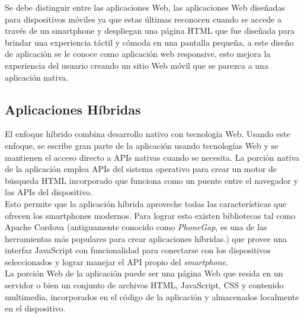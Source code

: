   Se debe distinguir entre las aplicaciones Web, las aplicaciones Web diseñadas para dispositivos móviles ya que estas últimas reconocen cuando se accede a través de un smartphone y despliegan una página HTML que fue diseñada para brindar una experiencia táctil y cómoda en una pantalla pequeña, a este diseño de aplicación se le conoce como aplicación web responsive, esto mejora la experiencia del usuario creando un sitio Web móvil que se parezca a una aplicación nativa.\\


  \subsection{Aplicaciones Híbridas}
  \label{sec:aplicaciones_hibridas}

    El enfoque híbrido combina desarrollo nativo con tecnología Web. Usando este enfoque, se escribe gran parte de la aplicación usando tecnologías Web y se mantienen el acceso directo a APIs nativas cuando se necesita. La porción nativa de la aplicación emplea APIs del sistema operativo para crear un motor de búsqueda HTML incorporado que funciona como un puente entre el navegador y las APIs del dispositivo. \cite{IBM_Mobile}\\

    Esto permite que la aplicación híbrida aproveche todas las características que ofrecen los smartphones modernos. Para lograr esto existen bibliotecas tal como Apache Cordova (antiguamente conocido como \emph{PhoneGap}, es una de las herramientas más populares para crear aplicaciones híbridas.) que provee una interfaz JavaScript con funcionalidad para conectarse con los dispositivos seleccionados y lograr manejar el API propio del \emph{smartphone}.\\

    La porción Web de la aplicación puede ser una página Web que resida en un servidor o bien un conjunto de archivos HTML, JavaScript, CSS y contenido multimedia, incorporados en el código de la aplicación y almacenados localmente en el dispositivo. \cite{IBM_Mobile}\\




